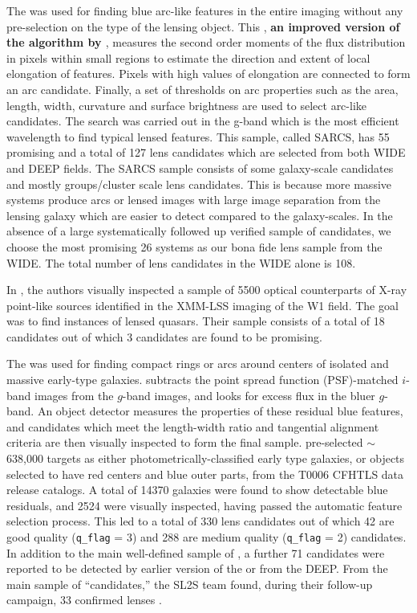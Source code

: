 \documentclass[useAMS,usenatbib,a4paper]{mn2e}
\begin{document}
The \af \citep{More2012} was used for finding blue arc-like features in
the entire \cfhtls imaging without any pre-selection on the type of the lensing
object. This \af, {\bf an improved version of the algorithm by
\citet{Alard2006}}, measures the second order moments of the flux distribution
in pixels within small regions to estimate the direction and extent of local
elongation of features. Pixels with high values of elongation are connected to
form an arc candidate. Finally, a set of thresholds on arc properties such as
the area, length, width, curvature and surface brightness are used to select
arc-like candidates. The search was carried out in the g-band which is the most
efficient wavelength to find typical lensed features.  This sample, called
SARCS, has 55 promising and a total of 127 lens candidates which are selected
from both \cfhtls WIDE and DEEP fields. The SARCS sample consists of some
galaxy-scale candidates and mostly groups/cluster scale lens candidates. This is
because more massive systems produce arcs or lensed images with large image
separation from the lensing galaxy which are easier to detect compared to the
galaxy-scales. In the absence of a large systematically followed up
verified sample of candidates, we choose the most promising 26 systems
as our bona fide lens sample from the \cfhtls WIDE. The total
number of lens candidates in the \cfhtls WIDE alone is 108.

In \citet{Elyiv2013}, the authors visually inspected a sample of 5500 optical
counterparts of X-ray point-like sources identified in the XMM-LSS
imaging of the \cfhtls W1 field. The goal was to find instances
of lensed quasars. Their sample consists of a total of 18 candidates out
of which 3 candidates are found to be promising.

The \rf \citep{Gavazzi2014} was used for finding compact rings or arcs
around centers of isolated and massive early-type galaxies. \rf
subtracts the point spread function (PSF)-matched $i$-band images from the $g$-band images, and
looks for excess flux in the bluer $g$-band. An object detector measures
the properties of these residual blue features, and candidates which
meet the length-width ratio and tangential alignment criteria are then
visually inspected to form the final sample. \citet{Gavazzi2014}
pre-selected $\sim$638,000 targets as either photometrically-classified
early type galaxies, or objects selected to have red centers and blue
outer parts, from the T0006 CFHTLS data release catalogs. A total of
14370 galaxies were found to show detectable blue residuals, and 2524
were visually inspected, having passed the automatic feature selection
process. This led to a total of 330 lens candidates out of which 42 are
good quality (\texttt{q\_flag} = 3) and 288 are medium quality
(\texttt{q\_flag} = 2) candidates. In addition to the main well-defined
sample of \citet{Gavazzi2014}, a further 71 candidates were reported to
be detected by earlier version of the \rf or from the \cfhtls DEEP.
From the main sample of ``\rf candidates,'' the SL2S team found, during
their follow-up campaign, 33 confirmed lenses \citep{Sonnenfeld2013a,Sonnenfeld2013b}.
\end{document}
